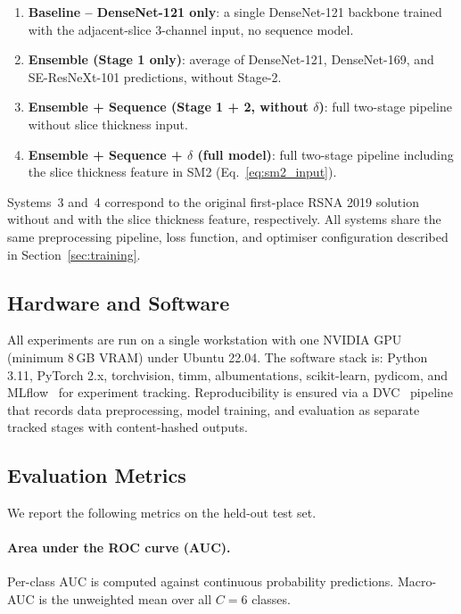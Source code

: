 \begin{enumerate}
    \item \textbf{Baseline -- DenseNet-121 only}: a single DenseNet-121
          backbone trained with the adjacent-slice 3-channel input, no
          sequence model.
    \item \textbf{Ensemble (Stage 1 only)}: average of DenseNet-121,
          DenseNet-169, and SE-ResNeXt-101 predictions, without Stage-2.
    \item \textbf{Ensemble + Sequence (Stage 1 + 2, without $\delta$)}:
          full two-stage pipeline without slice thickness input.
    \item \textbf{Ensemble + Sequence + $\delta$ (full model)}: full
          two-stage pipeline including the slice thickness feature in SM2
          (Eq.~\ref{eq:sm2_input}).
\end{enumerate}

Systems~3 and~4 correspond to the original first-place RSNA 2019 solution
without and with the slice thickness feature, respectively.
All systems share the same preprocessing pipeline, loss function, and
optimiser configuration described in Section~\ref{sec:training}.

\subsection{Hardware and Software}

All experiments are run on a single workstation with one NVIDIA GPU
(minimum 8\,GB VRAM) under Ubuntu 22.04.
The software stack is: Python 3.11, PyTorch 2.x, torchvision, timm,
albumentations, scikit-learn, pydicom, and MLflow~\cite{mlflow2018} for
experiment tracking.
Reproducibility is ensured via a DVC~\cite{ruslan2020dvc} pipeline that
records data preprocessing, model training, and evaluation as separate
tracked stages with content-hashed outputs.

\subsection{Evaluation Metrics}
\label{sec:metrics}

We report the following metrics on the held-out test set.

\paragraph{Area under the ROC curve (AUC).}
Per-class AUC is computed against continuous probability predictions.
Macro-AUC is the unweighted mean over all $C = 6$ classes.

